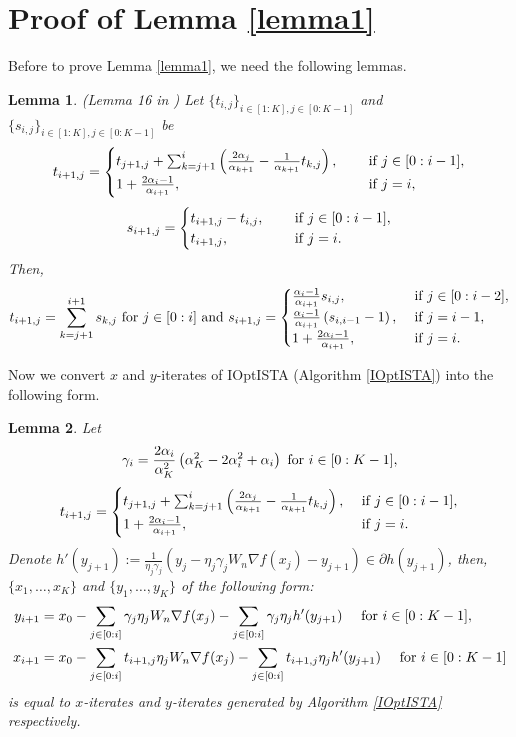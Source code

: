 \documentclass{article}
\newtheorem{lemma}{Lemma}%
\begin{document}
\section{Proof of Lemma \ref{lemma1}} \label{pf_lemma1}
Before to prove Lemma \ref{lemma1}, we need the following lemmas.
\begin{lemma} \label{lemma2}
(Lemma 16 in \cite{JangGR23})
Let $\{t_{i,j}\}_{i\in[1:K],j\in[0:K-1]}$ and $\{s_{i,j}\}_{i\in[1:K],j\in[0:K-1]}$ be
\[
t_{i+1,j}=\begin{cases}
t_{j+1,j}+\sum_{k=j+1}^{i}\left(\frac{2\alpha_j}{\alpha_{k+1}}-\frac{1}{\alpha_{k+1}}t_{k,j}
\right),\quad &\textup{ if } j\in[0:i-1], \\
1+\frac{2\alpha_i-1}{\alpha_{i+1}},\quad &\textup{ if } j=i,\end{cases}
\]
\[
s_{i+1,j}=\begin{cases}
   t_{i+1,j}-t_{i,j},\quad   &\textup{ if } j\in[0:i-1],\\
   t_{i+1,j},\quad  &\textup{ if } j=i.
\end{cases}
\]
Then,
 \[
 t_{i+1,j}=\sum_{k=j+1}^{i+1} s_{k,j} \textup{ for } j\in[0:i]
\textup{ and }
s_{i+1,j}=\begin{cases}
    \frac{\alpha_i-1}{\alpha_{i+1}}s_{i,j},& \textup{ if } j\in[0:i-2],\\
    \frac{\alpha_i-1}{\alpha_{i+1}}\left(s_{i,i-1}-1\right),& \textup{ if } j=i-1,\\
    1+\frac{2\alpha_i-1}{\alpha_{i+1}}, &\textup{ if }  j=i.
\end{cases}
\]
\end{lemma}
Now we convert $x$ and $y$-iterates of IOptISTA (Algorithm \ref{IOptISTA}) into the following form.
\begin{lemma}\label{lemma3}
Let
\[
\gamma_i=\frac{2\alpha_i}{\alpha_K^2}\left(\alpha_K^2-2\alpha_i^2+\alpha_i\right) \textup{ for } i\in[0:K-1],
\]
\[
t_{i+1,j}=\begin{cases} t_{j+1,j}+\sum_{k=j+1}^{i}\left(\frac{2\alpha_j}{\alpha_{k+1}}-\frac{1}{\alpha_{k+1}}t_{k,j}\right), &\textup{ if } j\in[0:i-1],
\\ 1+\frac{2\alpha_i-1}{\alpha_{i+1}}, &\textup{ if } j=i.\end{cases}
\]
Denote $h'(y_{j+1}):=\frac{1}{\eta_{j}\gamma_{j}}(y_{j}-\eta_{j}\gamma_{j}W_{n}\nabla f(x_{j})-y_{j+1})\in \partial h(y_{j+1})$,  then,  $\{x_1,\ldots,x_{K}\}$ and  $\{y_1,\ldots,y_K\}$ of the following  form:
\begin{equation}
    \begin{aligned}
    y_{i+1}&=x_0-\sum_{j\in[0:i]}\gamma_j\eta_{j} W_{n}\nabla f(x_j)- \sum_{j\in[0:i]}\gamma_j\eta_{j}h'(y_{j+1}) \quad\textup{ for } i\in[0:K-1],\\
     x_{i+1}&=x_0-\sum_{j\in[0:i]}t_{i+1,j}\eta_{j}W_{n}\nabla f(x_j)- \sum_{j\in[0:i]}t_{i+1,j}\eta_{j}h'(y_{j+1})
     \quad \textup{ for } i\in[0:K-1]
    \end{aligned}
        \label{equivalent_xy}
\end{equation}
is equal to $x$-iterates and $y$-iterates generated by Algorithm \ref{IOptISTA} respectively.
\end{lemma}
\end{document}
